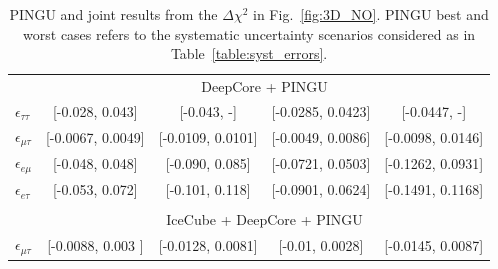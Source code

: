 \documentclass[draft=True]{revtex4-2}
\newcommand{\emt}{\ensuremath{\epsilon_{\mu\tau}}}
\newcommand{\eet}{\epsilon_{e\tau}}
\newcommand{\eem}{\epsilon_{e\mu}}
\newcommand{\ett}{\ensuremath{\epsilon_{\tau\tau}}}
\begin{document}
{{\begin{table}
\begin{tabular}{lcccc}
      & \multicolumn{4}{c}{DeepCore + PINGU} \\
      $\ett$ & [-0.028, 0.043] & [-0.043, -] & [-0.0285,  0.0423] & [-0.0447, -]\\
      $\emt$ & [-0.0067, 0.0049] & [-0.0109,  0.0101] & [-0.0049, 0.0086] & [-0.0098, 0.0146]\\
      $\eem$ & [-0.048, 0.048]  & [-0.090, 0.085] & [-0.0721, 0.0503] & [-0.1262, 0.0931]\\
      $\eet$ & [-0.053, 0.072]  & [-0.101, 0.118] & [-0.0901, 0.0624] & [-0.1491, 0.1168]\\\\
      & \multicolumn{4}{c}{IceCube + DeepCore + PINGU}  \\
      $\emt$ & [-0.0088,  0.003 ] & [-0.0128, 0.0081] & [-0.01, 0.0028] & [-0.0145, 0.0087]\\
      \hline
      \hline
   \end{tabular}
   \caption{PINGU and joint results from the $\Delta \chi^2$ in Fig.~\ref{fig:3D_NO}. PINGU best and worst cases refers to 
   the systematic uncertainty scenarios considered as in Table~\ref{table:syst_errors}.}\label{table:PINGU_joint_results}
\end{table}

}}
\end{document}
